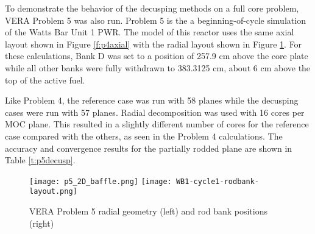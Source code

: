 To demonstrate the behavior of the decusping methods on a full core problem, VERA Problem 5 was also run.  Problem 5 is the a beginning-of-cycle simulation of the Watts Bar Unit 1 PWR.  The model of this reactor uses the same axial layout shown in Figure \ref{f:p4axial} with the radial layout shown in Figure \ref{f:p5radial}.  For these calculations, Bank D was set to a position of 257.9 cm above the core plate while all other banks were fully withdrawn to 383.3125 cm, about 6 cm above the top of the active fuel.

Like Problem 4, the reference case was run with 58 planes while the decusping cases were run with 57 planes.  Radial decomposition was used with 16 cores per MOC plane.  This resulted in a slightly different number of cores for the reference case compared with the others, as seen in the Problem 4 calculations.  The accuracy and convergence results for the partially rodded plane are shown in Table \ref{t:p5decusp}.

\begin{figure}[h]
\centering
\texttt{[image: p5\_2D\_baffle.png]}
\hfill
\texttt{[image: WB1-cycle1-rodbank-layout.png]}
\caption{VERA Problem 5 radial geometry (left) and rod bank positions (right)}\label{f:p5radial}
\end{figure}

\begin{table}[h]
\centering
\caption[VERA Problem 5 Decusping Results]{VERA Problem 5 decusping results for the partially rodded plane}\label{t:p5decusp}
\end{table}

